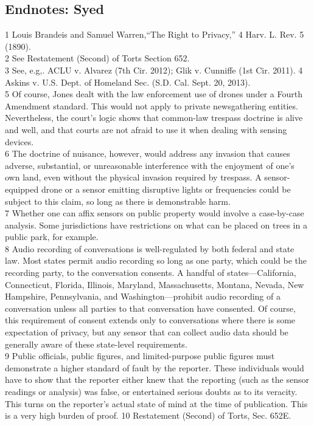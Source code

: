 \begin{itemize}
\begin{itemized}
\begin{itemize}
\section{Endnotes: Syed}
1 Louis Brandeis and Samuel Warren,``The Right to Privacy,'' 4 Harv. L. Rev. 5 (1890).\\
2 See Restatement (Second) of Torts Section 652.\\
3 See, e.g,. ACLU v. Alvarez (7th Cir. 2012); Glik v. Cunniffe (1st Cir. 2011).
4 Askins v. U.S. Dept. of Homeland Sec. (S.D. Cal. Sept. 20, 2013).\\
5 Of course, Jones dealt with the law enforcement use of drones under a Fourth Amendment
standard. This would not apply to private newsgathering entities. Nevertheless, the court's logic
shows that common-law trespass doctrine is alive and well, and that courts are not afraid to use it
when dealing with sensing devices.\\
6 The doctrine of nuisance, however, would address any invasion that causes adverse, substantial,
or unreasonable interference with the enjoyment of one's own land, even without the physical
invasion required by trespass. A sensor-equipped drone or a sensor emitting disruptive lights or
frequencies could be subject to this claim, so long as there is demonstrable harm.\\
7 Whether one can affix sensors on public property would involve a case-by-case analysis.
Some jurisdictions have restrictions on what can be placed on trees in a public park, for example.\\
8 Audio recording of conversations is well-regulated by both federal and state law. Most states
permit audio recording so long as one party, which could be the recording party, to the
conversation consents. A handful of states—California, Connecticut, Florida, Illinois, Maryland,
Massachusetts, Montana, Nevada, New Hampshire, Pennsylvania, and Washington—prohibit
audio recording of a conversation unless all parties to that conversation have consented.
Of course, this requirement of consent extends only to conversations where there is some
expectation of privacy, but any sensor that can collect audio data should be generally aware of
these state-level requirements.\\
9 Public officials, public figures, and limited-purpose public figures must demonstrate a higher
standard of fault by the reporter. These individuals would have to show that the reporter either
knew that the reporting (such as the sensor readings or analysis) was false, or entertained
serious doubts as to its veracity. This turns on the reporter's actual state of mind at the time of publication. This is a very high burden of proof.
10 Restatement (Second) of Torts, Sec. 652E.\\


\end{itemize}
\end{itemized}
\end{itemize}
